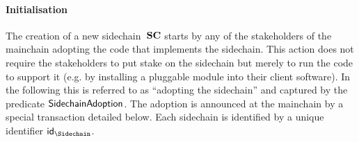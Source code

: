 \paragraph{Initialisation}

The creation of a new sidechain~$\mathbf{SC}$ starts by any of the stakeholders of the
mainchain adopting the code that implements the sidechain. This action does not
require the stakeholders to put stake on the sidechain but merely to run the
code to support it (e.g. by installing a pluggable module into their client
software). In the following this is referred to as ``adopting the sidechain''
and captured by the predicate $\mathsf{SidechainAdoption}$.
The adoption is  announced at the mainchain by a special transaction
detailed below.  Each sidechain is identified by a unique identifier $\id_\Sidechain$.

